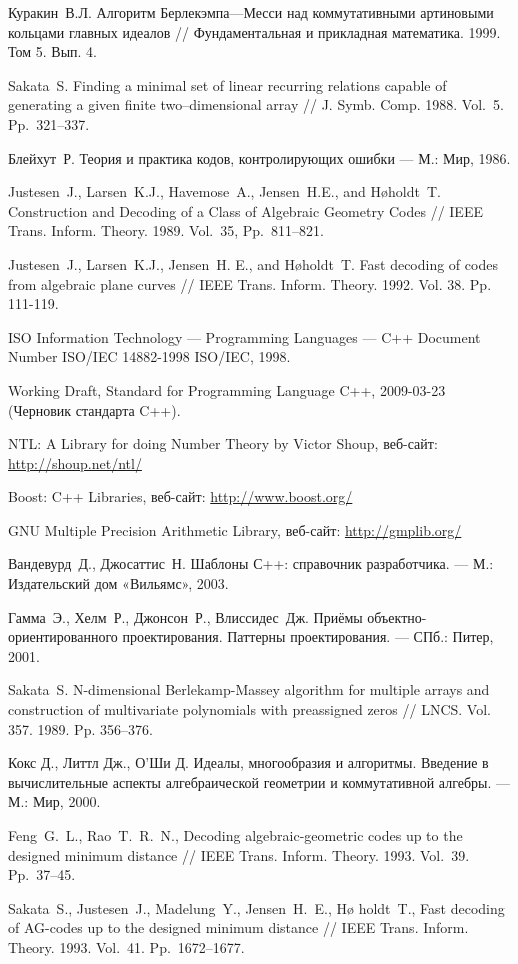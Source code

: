 \documentclass[14pt]{extarticle}
\begin{document}
\begin{thebibliography}{99}
Куракин~В.Л. Алгоритм Берлекэмпа—Месси над коммутативными
артиновыми кольцами главных идеалов // Фундаментальная и прикладная математика.
1999. Том 5. Вып. 4.

Sakata~S. Finding a minimal set of linear recurring
relations capable of generating a given finite two–dimensional array // J. Symb.
Comp. 1988. Vol.~5. Pp.~321–337.

Блейхут~Р. Теория и практика кодов, контролирующих ошибки
 — М.: Мир, 1986.

Justesen~J., Larsen~K.J., Havemose~A., Jensen~H.E., and
H\o holdt~T. Construction and Decoding of a Class of Algebraic Geometry Codes //
IEEE Trans. Inform. Theory. 1989. Vol.~35, Pp.~811–821.

Justesen~J., Larsen~K.J., Jensen~H. E., and H\o holdt~T.
Fast decoding of codes from algebraic plane curves // IEEE Trans. Inform.
Theory. 1992. Vol. 38. Pp. 111-119.

ISO Information Technology — Programming Languages —
C++ Document Number ISO/IEC 14882-1998 ISO/IEC, 1998.

Working Draft, Standard for Programming Language C++, 2009-03-23
(Черновик стандарта C++).

NTL: A Library for doing Number Theory by Victor Shoup,
веб-сайт: \url{http://shoup.net/ntl/}

Boost: C++ Libraries, веб-сайт: \url{http://www.boost.org/}

GNU Multiple Precision Arithmetic Library, веб-сайт: \url{http://gmplib.org/}

Вандевурд~Д., Джосаттис~Н. Шаблоны С++: справочник
разработчика. — М.: Издательский дом «Вильямс», 2003.

Гамма~Э., Хелм~Р., Джонсон~Р., Влиссидес~Дж. Приёмы
объект\-но-ориентированного проектирования. Паттерны проектирования. — СПб.:
Питер, 2001.

Sakata~S. N-dimensional Berlekamp-Massey algorithm for
multiple arrays and construction of multivariate polynomials with
preassigned zeros // LNCS. Vol. 357. 1989. Pp. 356–376.

Кокс Д., Литтл Дж., О’Ши Д. Идеалы, многообразия и алгоритмы.
Введение в вычислительные аспекты алгебраической геометрии и коммутативной
алгебры. — М.: Мир, 2000.

Feng~G.~L., Rao~T.~R.~N., Decoding algebraic-geometric codes
up to the designed minimum distance // IEEE Trans. Inform. Theory. 1993.
Vol.~39. Pp.~37–45.

Sakata~S., Justesen~J., Madelung~Y., Jensen~H.~E., H\o
holdt~T., Fast decoding of AG-codes up to the designed minimum distance // IEEE
Trans. Inform. Theory. 1993. Vol.~41. Pp.~1672–1677.

\end{thebibliography}
\end{document}
